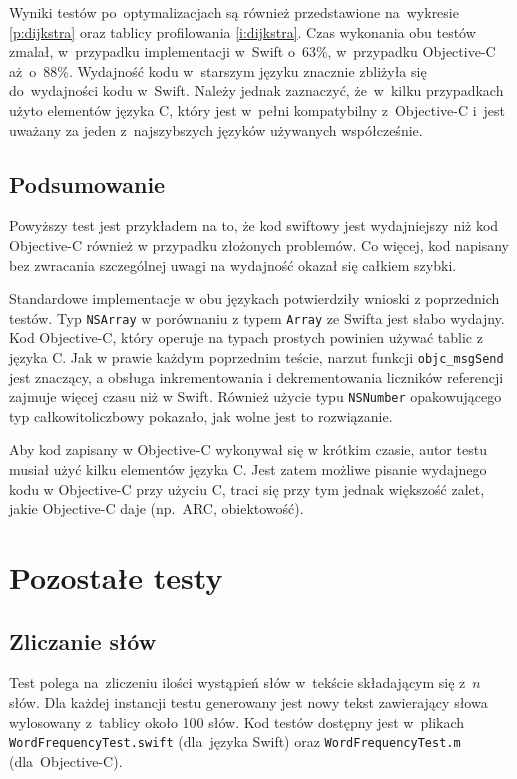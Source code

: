 \documentclass[mgr, shortabstract]{iithesis}
\newcommand{\swiftinline}[1]{
    \texttt{#1}
}
\newcommand{\objcinline}[1]{
    \texttt{#1}
}
\begin{document}
Wyniki testów po~optymalizacjach są również przedstawione na~wykresie \ref{p:dijkstra} oraz tablicy profilowania \ref{i:dijkstra}. Czas wykonania obu testów zmalał, w~przypadku implementacji w~Swift o~$63\%$, w~przypadku Objective-C aż~o~$88\%$. Wydajność kodu w~starszym języku znacznie zbliżyła się do~wydajności kodu w~Swift. Należy jednak zaznaczyć, że~w~kilku przypadkach użyto elementów języka C, który jest w~pełni kompatybilny z~Objective-C i~jest uważany za jeden z~najszybszych języków używanych współcześnie.

\subsection{Podsumowanie}

Powyższy test jest przykładem na to, że kod swiftowy jest wydajniejszy niż kod Objective-C również w przypadku złożonych problemów. Co więcej, kod napisany bez zwracania szczególnej uwagi na wydajność okazał się całkiem szybki.

Standardowe implementacje w obu językach potwierdziły wnioski z poprzednich testów. Typ \objcinline{NSArray} w porównaniu z typem \swiftinline{Array} ze Swifta jest słabo wydajny. Kod Objective-C, który operuje na typach prostych powinien używać tablic z języka C. Jak w prawie każdym poprzednim teście, narzut funkcji \swiftinline{objc_msgSend} jest znaczący, a obsługa inkrementowania i dekrementowania liczników referencji zajmuje więcej czasu niż w Swift. Również użycie typu \objcinline{NSNumber} opakowującego typ całkowitoliczbowy pokazało, jak wolne jest to rozwiązanie.

Aby kod zapisany w Objective-C wykonywał się w krótkim czasie, autor testu musiał użyć kilku elementów języka C. Jest zatem możliwe pisanie wydajnego kodu w Objective-C przy użyciu C, traci się przy tym jednak większość zalet, jakie Objective-C daje (np.~ARC, obiektowość).

\section{Pozostałe testy}

\subsection{Zliczanie słów}

Test polega na~zliczeniu ilości wystąpień słów w~tekście składającym się z~$n$ słów. Dla każdej instancji testu generowany jest nowy tekst zawierający słowa wylosowany z~tablicy około 100 słów. Kod testów dostępny jest w~plikach \texttt{WordFrequencyTest.swift} (dla~języka Swift) oraz \texttt{WordFrequencyTest.m} (dla~Objective-C).
\end{document}
